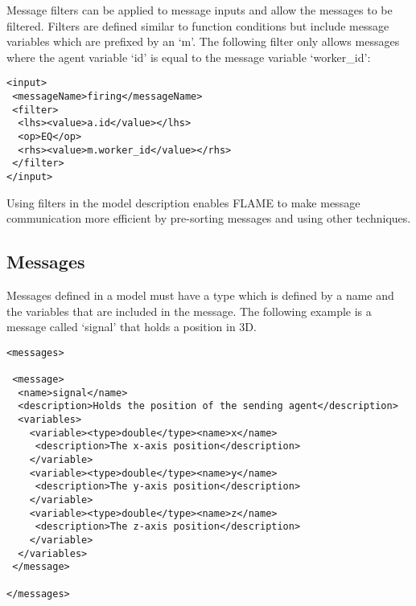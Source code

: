 Message filters can be applied to message inputs and allow the messages to be
filtered. Filters are defined similar to function conditions but include
message variables which are prefixed by an `m'. The following filter only
allows messages where the agent variable `id' is equal to the message variable
`worker\_id':

\begin{mylisting}
\begin{verbatim}
<input>
 <messageName>firing</messageName>
 <filter>
  <lhs><value>a.id</value></lhs>
  <op>EQ</op>
  <rhs><value>m.worker_id</value></rhs>
 </filter>
</input>
\end{verbatim}
\end{mylisting}

Using filters in the model description enables FLAME to make message
communication more efficient by pre-sorting messages and using other techniques.


\subsection{Messages}

Messages defined in a model must have a type which is defined by a name and the
variables that are included in the message. The following example is a message
called `signal' that holds a position in 3D.

\begin{mylisting}
\begin{verbatim}
<messages>

 <message>
  <name>signal</name>
  <description>Holds the position of the sending agent</description>
  <variables>
    <variable><type>double</type><name>x</name>
     <description>The x-axis position</description>
    </variable>
    <variable><type>double</type><name>y</name>
     <description>The y-axis position</description>
    </variable>
    <variable><type>double</type><name>z</name>
     <description>The z-axis position</description>
    </variable>
  </variables>
 </message>

</messages>
\end{verbatim}
\end{mylisting}
